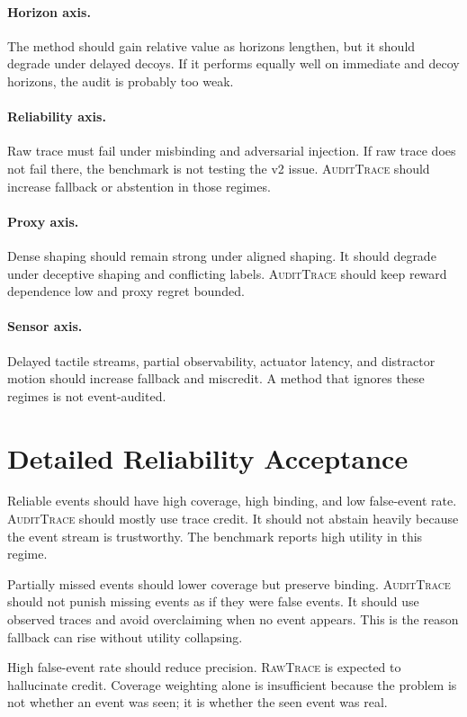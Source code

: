 \documentclass{article}
\newcommand{\method}{\textsc{AuditTrace}\xspace}
\newcommand{\rawtrace}{\textsc{RawTrace}\xspace}
\begin{document}
\paragraph{Horizon axis.}
The method should gain relative value as horizons lengthen, but it should degrade under delayed decoys. If it performs equally well on immediate and decoy horizons, the audit is probably too weak.

\paragraph{Reliability axis.}
Raw trace must fail under misbinding and adversarial injection. If raw trace does not fail there, the benchmark is not testing the v2 issue. \method should increase fallback or abstention in those regimes.

\paragraph{Proxy axis.}
Dense shaping should remain strong under aligned shaping. It should degrade under deceptive shaping and conflicting labels. \method should keep reward dependence low and proxy regret bounded.

\paragraph{Sensor axis.}
Delayed tactile streams, partial observability, actuator latency, and distractor motion should increase fallback and miscredit. A method that ignores these regimes is not event-audited.

\section{Detailed Reliability Acceptance}

Reliable events should have high coverage, high binding, and low false-event rate. \method should mostly use trace credit. It should not abstain heavily because the event stream is trustworthy. The benchmark reports high utility in this regime.

Partially missed events should lower coverage but preserve binding. \method should not punish missing events as if they were false events. It should use observed traces and avoid overclaiming when no event appears. This is the reason fallback can rise without utility collapsing.

High false-event rate should reduce precision. \rawtrace is expected to hallucinate credit. Coverage weighting alone is insufficient because the problem is not whether an event was seen; it is whether the seen event was real.
\end{document}
